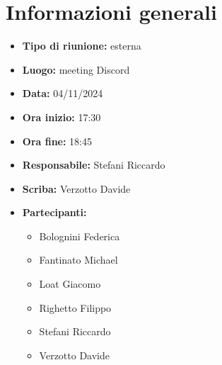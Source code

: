 


\section{Informazioni generali}

\begin{itemize}
    \item \textbf{Tipo di riunione:} esterna
    \item \textbf{Luogo:} meeting Discord
    \item \textbf{Data:} 04/11/2024
    \item \textbf{Ora inizio:} 17:30
    \item \textbf{Ora fine:} 18:45
    \item \textbf{Responsabile:} Stefani Riccardo
    \item \textbf{Scriba:} Verzotto Davide
    \item \textbf{Partecipanti:}
    \begin{itemize}
        \renewcommand{\labelitemii}{--}
        \item Bolognini Federica
        \item Fantinato Michael
        \item Loat Giacomo
        \item Righetto Filippo
        \item Stefani Riccardo
        \item Verzotto Davide
    \end{itemize}
\end{itemize}
